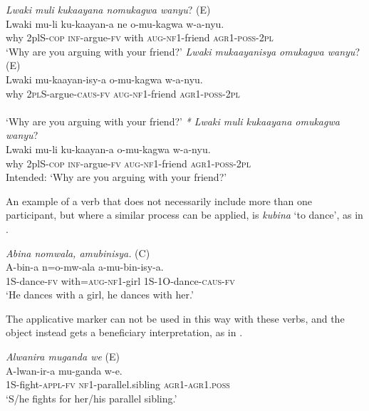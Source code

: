 \documentclass[output=paper,colorlinks,citecolor=brown,draftmode]{langscibook}
\begin{document}
\ea
\begin{xlist}   \label{ex:Saebo:comitative}
 \ex \label{ex:Saebo:comitativeA} \emph{Lwaki muli kukaayana nomukagwa wanyu}? (E) \\
  \gll Lwaki mu-li ku-kaayan-a ne o-mu-kagwa w-a-nyu.  \\ 
why 2plS-\textsc{cop} \textsc{inf}-argue-\textsc{fv} with \textsc{aug}-\textsc{nf1}-friend \textsc{agr1-poss-2pl} \\
    \glt  `Why are you arguing with your friend?' 
    \ex \label{ex:Saebo:comitativeB} \emph{Lwaki mukaayanisya omukagwa wanyu}? (E)\\
  \gll Lwaki mu-kaayan-isy-a o-mu-kagwa w-a-nyu.  \\ 
why \textsc{2pl}S-argue-\textsc{caus-fv} \textsc{aug}-\textsc{nf1}-friend \textsc{agr1-poss-2pl} \\ 
\textsc{} \\
    \glt  `Why are you arguing with your friend?' 
    \ex \label{ex:Saebo:comitativeC} \emph{* Lwaki muli kukaayana omukagwa wanyu}? \\
  \gll Lwaki mu-li ku-kaayan-a o-mu-kagwa w-a-nyu.  \\ 
why 2plS-\textsc{cop} \textsc{inf}-argue-\textsc{fv} \textsc{aug}-\textsc{nf1}-friend \textsc{agr1-poss-2pl} \\
    \glt  Intended: `Why are you arguing with your friend?' 
      \end{xlist}     
      \z

An example of a verb that does not necessarily include more than one participant, but where a similar process can be applied, is \emph{kubina} `to dance', as in .

\ea \label{ex:Saebo:dance} \emph{Abina nomwala, amubinisya.} (C)\\
  \gll  A-bin-a n=o-mw-ala a-mu-bin-isy-a. \\ 
1S-dance-\textsc{fv} with=\textsc{aug-nf1}-girl 1S-1O-dance-\textsc{caus-fv}\\
    \glt  `He dances with a girl, he dances with her.' 
      \z

The applicative marker can not be used in this way with these verbs, and the object instead gets a beneficiary interpretation, as in . 

\ea \label{ex:Saebo:fight} \emph{Alwanira muganda we} (E) \\
  \gll  A-lwan-ir-a mu-ganda w-e. \\ 
1S-fight-\textsc{appl-fv} \textsc{nf1}-parallel.sibling \textsc{agr1-agr1.poss}\\
    \glt  `S/he fights for her/his parallel sibling.' 
      \z
\end{document}
